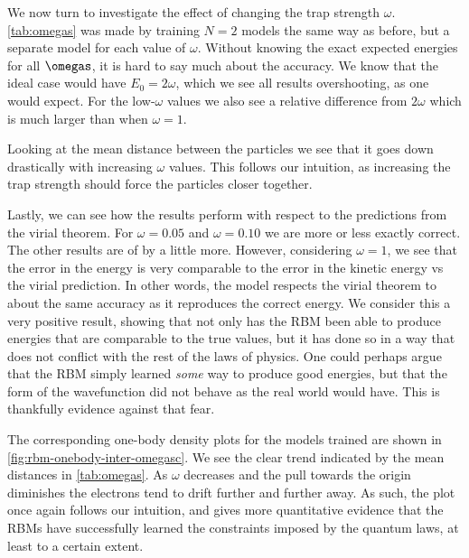 \documentclass[a4paper, 11pt]{article}
\begin{document}
\begin{multicols}{2}
    We now turn to investigate the effect of changing the trap strength
    $\omega$. \autoref{tab:omegas} was made by training $N=2$ models the same way
    as before, but a separate model for each value of $\omega$. Without knowing
    the exact expected energies for all $\omegas$, it is hard to say much about
    the accuracy. We know that the ideal case would have $E_0=2\omega$, which we
    see all results overshooting, as one would expect. For the low-$\omega$
    values we also see a relative difference from $2\omega$ which is much larger
    than when $\omega =1$. 

    Looking at the mean distance between the particles we see that it goes down
    drastically with increasing $\omega$ values. This follows our intuition, as
    increasing the trap strength should force the particles closer together. 

    Lastly, we can see how the results perform with respect to the predictions
    from the virial theorem. For $\omega=0.05$ and $\omega=0.10$ we are more or
    less exactly correct. The other results are of by a little more. However,
    considering $\omega=1$, we see that the error in the energy is very
    comparable to the error in the kinetic energy vs the virial prediction. In
    other words, the model respects the virial theorem to about the same
    accuracy as it reproduces the correct energy. We consider this a very
    positive result, showing that not only has the RBM been able to produce
    energies that are comparable to the true values, but it has done so in a way
    that does not conflict with the rest of the laws of physics. One could
    perhaps argue that the RBM simply learned \emph{some} way to produce good
    energies, but that the form of the wavefunction did not behave as the real
    world would have. This is thankfully evidence against that fear.


    The corresponding one-body density plots for the models trained are shown in
    \autoref{fig:rbm-onebody-inter-omegasc}. We see the clear trend indicated
    by the mean distances in \autoref{tab:omegas}. As $\omega$ decreases and the
    pull towards the origin diminishes the electrons tend to drift further and
    further away. As such, the plot once again follows our intuition, and gives
    more quantitative evidence that the RBMs have successfully learned the
    constraints imposed by the quantum laws, at least to a certain extent.

\end{multicols}
\end{document}
